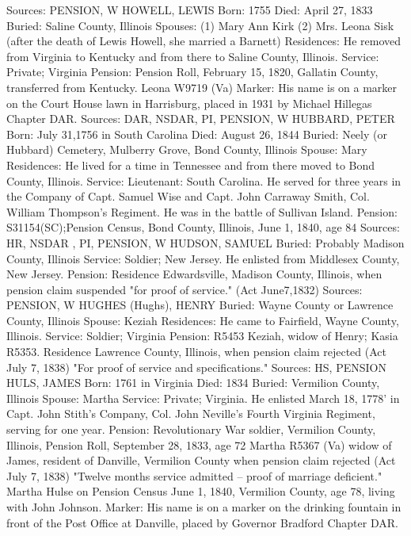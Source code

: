 Sources: PENSION, W 
HOWELL, LEWIS 
Born: 1755 
Died: April 27, 1833 
Buried: Saline County, Illinois 
Spouses: (1) Mary Ann Kirk
	 (2) Mrs. Leona Sisk (after the death of Lewis Howell, she married a Barnett) 
Residences: He removed from Virginia to Kentucky and from there to Saline County, Illinois. 
Service: Private; Virginia 
Pension: Pension Roll, February 15, 1820, Gallatin County, transferred from Kentucky. Leona W9719 (Va) 
Marker: His name is on a marker on the Court House lawn in Harrisburg, placed in 1931 by Michael Hillegas Chapter DAR. 
Sources: DAR, NSDAR, PI, PENSION, W 
HUBBARD, PETER 
Born: July 31,1756 in South Carolina 
Died: August 26, 1844 
Buried: Neely (or Hubbard) Cemetery, Mulberry Grove, Bond County, Illinois Spouse: Mary Residences: He lived for a time in Tennessee and from there moved to Bond County, Illinois.
Service: Lieutenant: South Carolina. He served for three years in the Company of Capt. Samuel Wise and Capt. John Carraway Smith, Col. William Thomp­son's Regiment. He was in the battle of Sullivan Island. 
Pension: S31154(SC);Pension Census, Bond County, Illinois, June 1, 1840, age 84 
Sources: HR, NSDAR , PI, PENSION, W 
HUDSON, SAMUEL 
Buried: Probably Madison County, Illinois 
Service: Soldier; New Jersey. He enlisted from Middlesex County, New Jersey. 
Pension: Residence Edwardsville, Madison County, Illinois, when pension claim suspended "for proof of service." (Act June7,1832) 
Sources: PENSION, W 
HUGHES (Hughs), HENRY 
Buried: Wayne County or Lawrence County, Illinois 
Spouse: Keziah 
Residences: He came to Fairfield, Wayne County, Illinois. 
Service: Soldier; Virginia 
Pension: R5453 Keziah, widow of Henry; Kasia R5353. Residence Lawrence County, Illinois, when pension claim rejected (Act July 7, 1838) "For proof of service and specifications." 
Sources: HS, PENSION 
HULS, JAMES 
Born: 1761 in Virginia 
Died: 1834 Buried: Vermilion County, Illinois 
Spouse: Martha 
Service: Private; Virginia. He enlisted March 18, 1778' in Capt. John Stith's Company, Col. John Neville's Fourth Virginia Regiment, serving for one year. 
Pension: Revolutionary War soldier, Vermilion County, Illinois, Pension Roll, September 28, 1833, age 72 Martha R5367 (Va) widow of James, resident of Danville, Vermilion County when pension claim rejected (Act July 7, 1838) "Twelve months service admitted -- proof of marriage deficient." Martha Hulse on Pension Census June 1, 1840, Vermilion County, age 78, living with John Johnson. 
Marker: His name is on a marker on the drinking fountain in front of the Post Office at Danville, placed by Governor Bradford Chapter DAR. 
